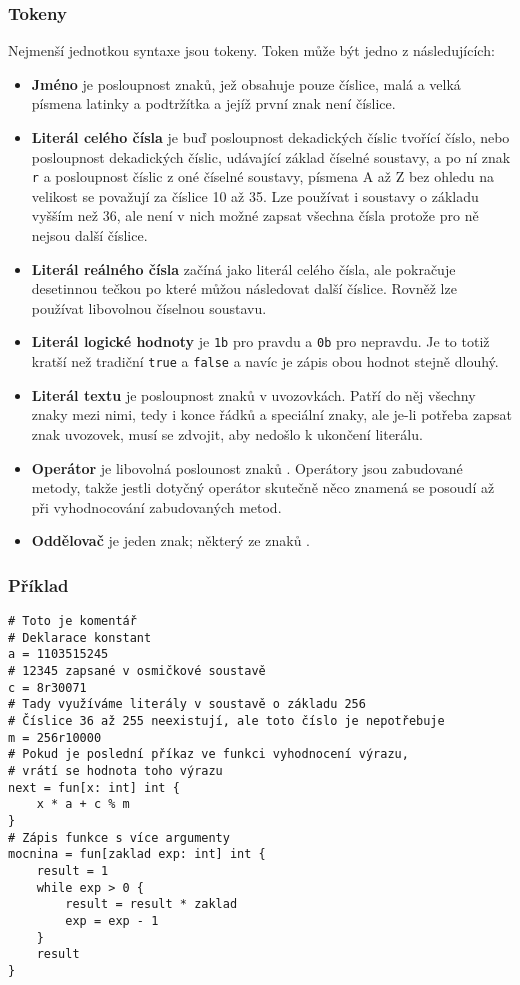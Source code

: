 \documentclass[a4paper,12pt]{article}
\def\circumflex{\char`\^}
\begin{document}
\subsubsection{Tokeny}
Nejmenší jednotkou syntaxe jsou tokeny. Token může být jedno z následujících:
\begin{itemize}
\item \textbf{Jméno} je posloupnost znaků, jež obsahuje pouze číslice, malá a velká písmena latinky a podtržítka a jejíž první znak není číslice.
\item \textbf{Literál celého čísla} je buď posloupnost dekadických číslic tvořící číslo, nebo posloupnost dekadických číslic, udávající základ číselné soustavy, a po ní znak \texttt{r} a posloupnost číslic z oné číselné soustavy, písmena A až Z bez ohledu na velikost se považují za číslice 10 až 35. Lze používat i soustavy o základu vyšším než 36, ale není v nich možné zapsat všechna čísla protože pro ně nejsou další číslice.
\item \textbf{Literál reálného čísla} začíná jako literál celého čísla, ale pokračuje desetinnou tečkou po které můžou následovat další číslice. Rovněž lze používat libovolnou číselnou soustavu.
\item \textbf{Literál logické hodnoty} je \texttt{1b} pro pravdu a \texttt{0b} pro nepravdu. Je to totiž kratší než tradiční \texttt{true} a \texttt{false} a navíc je zápis obou hodnot stejně dlouhý.
\item \textbf{Literál textu} je posloupnost znaků v uvozovkách. Patří do něj všechny znaky mezi nimi, tedy i konce řádků a speciální znaky, ale je-li potřeba zapsat znak uvozovek, musí se zdvojit, aby nedošlo k ukončení literálu.
\item \textbf{Operátor} je libovolná poslounost znaků \uv{\texttt{+-*/\%\&|\textasciitilde\circumflex<>=!}}. Operátory jsou zabudované metody, takže jestli dotyčný operátor skutečně něco znamená se posoudí až při vyhodnocování zabudovaných metod.
\item \textbf{Oddělovač} je jeden znak; některý ze znaků .
\end{itemize}

\subsubsection{Příklad}
\begin{verbatim}
# Toto je komentář
# Deklarace konstant
a = 1103515245
# 12345 zapsané v osmičkové soustavě
c = 8r30071
# Tady využíváme literály v soustavě o základu 256
# Číslice 36 až 255 neexistují, ale toto číslo je nepotřebuje
m = 256r10000
# Pokud je poslední příkaz ve funkci vyhodnocení výrazu,
# vrátí se hodnota toho výrazu
next = fun[x: int] int {
    x * a + c % m
}
# Zápis funkce s více argumenty
mocnina = fun[zaklad exp: int] int {
    result = 1
    while exp > 0 {
    	result = result * zaklad
    	exp = exp - 1
    }
    result
}
\end{verbatim}
\end{document}
